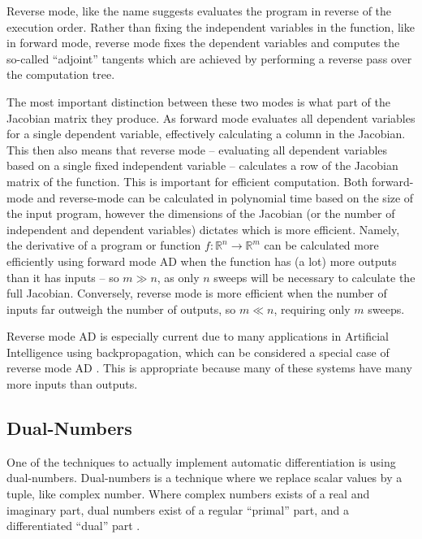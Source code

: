 \documentclass[a4paper]{article}
\begin{document}
            Reverse mode, like the name suggests evaluates the program in reverse of the execution order.
            Rather than fixing the independent variables in the function, like in forward mode, reverse mode fixes the dependent variables and computes the so-called ``adjoint'' tangents which are achieved by performing a reverse pass over the computation tree.

            The most important distinction between these two modes is what part of the Jacobian matrix they produce.
            As forward mode evaluates all dependent variables for a single dependent variable, effectively calculating a column in the Jacobian.
            This then also means that reverse mode -- evaluating all dependent variables based on a single fixed independent variable -- calculates a row of the Jacobian matrix of the function.
            This is important for efficient computation.
            Both forward-mode and reverse-mode can be calculated in polynomial time based on the size of the input program, however the dimensions of the Jacobian (or the number of independent and dependent variables) dictates which is more efficient.
            Namely, the derivative of a program or function $f:\mathbb{R}^n\to\mathbb{R}^m$ can be calculated more efficiently using forward mode AD when the function has (a lot) more outputs than it has inputs -- so $m\gg n$, as only $n$ sweeps will be necessary to calculate the full Jacobian.
            Conversely, reverse mode is more efficient when the number of inputs far outweigh the number of outputs, so $m\ll n$, requiring only $m$ sweeps.

            Reverse mode AD is especially current due to many applications in Artificial Intelligence using backpropagation, which can be considered a special case of reverse mode AD \cite{baydin2018survey}.
            This is appropriate because many of these systems have many more inputs than outputs.
            
        \subsection{Dual-Numbers}
            One of the techniques to actually implement automatic differentiation is using dual-numbers.
            Dual-numbers is a technique where we replace scalar values by a tuple, like complex number.
            Where complex numbers exists of a real and imaginary part, dual numbers exist of a regular ``primal'' part, and a differentiated ``dual'' part \cite{margossian2019review}.
            
\end{document}

